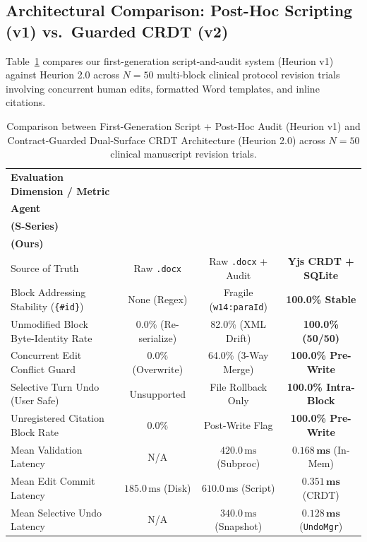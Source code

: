 \documentclass[11pt,a4paper]{article}
\makeatletter
\newcommand{\thead}[1]{\begin{tabular}[c]{@{}c@{}}#1\end{tabular}}
\makeatother
\begin{document}
\subsection{Architectural Comparison: Post-Hoc Scripting (v1) vs.\ Guarded CRDT (v2)}
Table~\ref{tab:v1_vs_v2} compares our first-generation script-and-audit system (Heurion v1) against Heurion 2.0 across $N=50$ multi-block clinical protocol revision trials involving concurrent human edits, formatted Word templates, and inline citations.

\begin{table}[!t]
\centering
\caption{Comparison between First-Generation Script + Post-Hoc Audit (Heurion v1) and Contract-Guarded Dual-Surface CRDT Architecture (Heurion 2.0) across $N=50$ clinical manuscript revision trials.}
\label{tab:v1_vs_v2}
\vspace{2pt}
\small
\setlength{\tabcolsep}{0pt}
\begin{tabular*}{\textwidth}{@{\extracolsep{\fill}}lccc@{}}
\toprule
\textbf{Evaluation Dimension / Metric} & \thead{\textbf{Vanilla Script}\\\textbf{Agent}} & \thead{\textbf{Heurion v1}\\\textbf{(S-Series)}} & \thead{\textbf{Heurion 2.0}\\\textbf{(Ours)}} \\
\midrule
Source of Truth & Raw \texttt{.docx} & Raw \texttt{.docx} + Audit & \textbf{Yjs CRDT + SQLite} \\
Block Addressing Stability (\texttt{\{\#id\}}) & None (Regex) & Fragile (\texttt{w14:paraId}) & \textbf{100.0\% Stable} \\
Unmodified Block Byte-Identity Rate & 0.0\% (Re-serialize) & 82.0\% (XML Drift) & \textbf{100.0\% (50/50)} \\
Concurrent Edit Conflict Guard & 0.0\% (Overwrite) & 64.0\% (3-Way Merge) & \textbf{100.0\% Pre-Write} \\
Selective Turn Undo (User Safe) & Unsupported & File Rollback Only & \textbf{100.0\% Intra-Block} \\
Unregistered Citation Block Rate & 0.0\% & Post-Write Flag & \textbf{100.0\% Pre-Write} \\
Mean Validation Latency & N/A & $420.0\,\text{ms}$ (Subproc) & $\mathbf{0.168\,\text{ms}}$ (In-Mem) \\
Mean Edit Commit Latency & $185.0\,\text{ms}$ (Disk) & $610.0\,\text{ms}$ (Script) & $\mathbf{0.351\,\text{ms}}$ (CRDT) \\
Mean Selective Undo Latency & N/A & $340.0\,\text{ms}$ (Snapshot) & $\mathbf{0.128\,\text{ms}}$ (\texttt{UndoMgr}) \\
\bottomrule
\end{tabular*}
\end{table}
\end{document}
